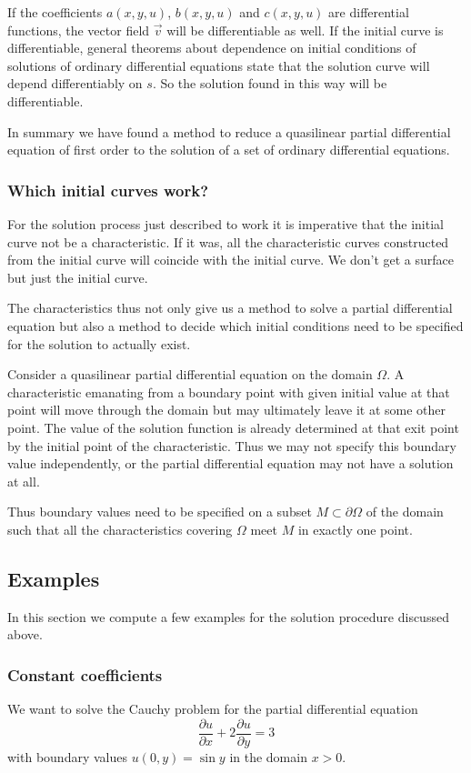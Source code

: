 If the coefficients $a(x,y,u)$, $b(x,y,u)$ and $c(x,y,u)$ are
differential functions, the vector field $\vec{v}$ will be differentiable
as well.
If the initial curve is differentiable, general theorems about dependence
on initial conditions of solutions of ordinary differential equations
state that the solution curve will depend differentiably on $s$.
So the solution found in this way will be differentiable.

In summary we have found a method to reduce a quasilinear partial differential
equation of first order to the solution of a set of ordinary differential
equations.

\subsubsection{Which initial curves work?}
For the solution process just described to work it is imperative that
the initial curve not be a characteristic.
If it was, all the characteristic curves constructed from the initial
curve will coincide with the initial curve.
We don't get a surface but just the initial curve.

The characteristics thus not only give us a method to solve a partial
differential equation but also a method to decide which initial
conditions need to be specified for the solution to actually exist.

Consider a quasilinear partial differential equation on the domain
$\Omega$.
A characteristic emanating from a boundary point with given initial
value at that point will move through the domain but may ultimately
leave it at some other point.
The value of the solution function is already determined at that exit
point by the initial point of the characteristic.
Thus we may not specify this boundary value independently, or the
partial differential equation may not have a solution at all.

Thus boundary values need to be specified on a subset
$M\subset\partial \Omega$ of the domain such that all the
characteristics covering $\Omega$ meet $M$ in exactly one point.

\subsection{Examples}
In this section we compute a few examples for the solution procedure
discussed above.

\subsubsection{Constant coefficients
\label{konstantekoeff}}
We want to solve the Cauchy problem for the partial differential equation
\[
\frac{\partial u}{\partial x}+2\frac{\partial u}{\partial y}=3
\]
with boundary values $u(0,y)=\sin y$ in the domain $x>0$.

